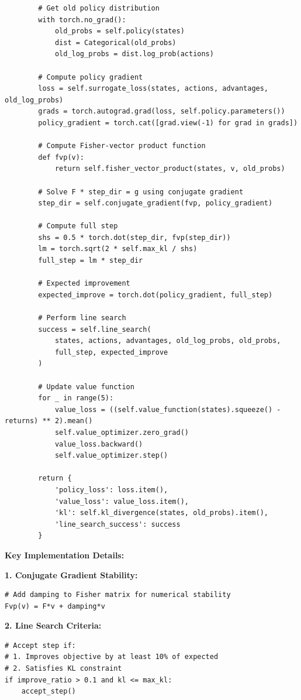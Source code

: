 \documentclass[12pt]{article}
\begin{document}
{{\begin{verbatim}
        # Get old policy distribution
        with torch.no_grad():
            old_probs = self.policy(states)
            dist = Categorical(old_probs)
            old_log_probs = dist.log_prob(actions)

        # Compute policy gradient
        loss = self.surrogate_loss(states, actions, advantages, old_log_probs)
        grads = torch.autograd.grad(loss, self.policy.parameters())
        policy_gradient = torch.cat([grad.view(-1) for grad in grads])

        # Compute Fisher-vector product function
        def fvp(v):
            return self.fisher_vector_product(states, v, old_probs)

        # Solve F * step_dir = g using conjugate gradient
        step_dir = self.conjugate_gradient(fvp, policy_gradient)

        # Compute full step
        shs = 0.5 * torch.dot(step_dir, fvp(step_dir))
        lm = torch.sqrt(2 * self.max_kl / shs)
        full_step = lm * step_dir

        # Expected improvement
        expected_improve = torch.dot(policy_gradient, full_step)

        # Perform line search
        success = self.line_search(
            states, actions, advantages, old_log_probs, old_probs,
            full_step, expected_improve
        )

        # Update value function
        for _ in range(5):
            value_loss = ((self.value_function(states).squeeze() - returns) ** 2).mean()
            self.value_optimizer.zero_grad()
            value_loss.backward()
            self.value_optimizer.step()

        return {
            'policy_loss': loss.item(),
            'value_loss': value_loss.item(),
            'kl': self.kl_divergence(states, old_probs).item(),
            'line_search_success': success
        }
\end{verbatim}

\textbf{Key Implementation Details:}

\textbf{1. Conjugate Gradient Stability:}
\begin{verbatim}
# Add damping to Fisher matrix for numerical stability
Fvp(v) = F*v + damping*v
\end{verbatim}

\textbf{2. Line Search Criteria:}
\begin{verbatim}
# Accept step if:
# 1. Improves objective by at least 10% of expected
# 2. Satisfies KL constraint
if improve_ratio > 0.1 and kl <= max_kl:
    accept_step()
\end{verbatim}

}}
\end{document}
